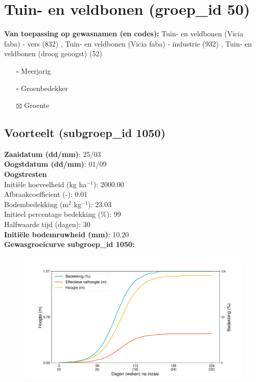 \documentclass{article}
\begin{document}
 \section{Tuin- en veldbonen (groep\_id 50)} 
 \textbf{Van toepassing op gewasnamen (en codes):} Tuin- en veldbonen (Vicia faba) - vers (832) , Tuin- en veldbonen (Vicia faba) - industrie (932) , Tuin- en veldbonen (droog geoogst) (52) 
 \begin{multicols}{3} \begin{itemize} \item[$\square$] Meerjarig \item[$\square$] Groenbedekker \item[$\boxtimes$] Groente \end{itemize} \end{multicols} 
 \subsection{Voorteelt (subgroep\_id 1050)} 
  \textbf{Zaaidatum (dd/mm)}: 25/03  \vspace{0.10cm} \\ 
  \textbf{Oogstdatum (dd/mm)}: 01/09  \vspace{0.10cm} \\ 
  \textbf{Oogstresten} \vspace{0.05cm} \\ 
  \tab Initi\"{e}le hoeveelheid (kg ha$^{-1}$): 2000.00 \vspace{0.05cm} \\ 
  \tab Afbraakcoefficient (-): 0.01 \vspace{0.05cm} \\ 
  \tab Bodembedekking (m$^2$ kg$^{-1}$): 23.03 \vspace{0.05cm} \\ 
  \tab Initieel percentage bedekking (\%): 99 \vspace{0.05cm} \\ 
  \tab Halfwaarde tijd (dagen): 30 \vspace{0.05cm} \\ 
  \textbf{Initi\"{e}le bodemruwheid (mm)}: 10.20 \vspace{0.05cm} \\ 
  \textbf{Gewasgroeicurve subgroep\_id 1050:} 
 \begin{center} \begin{figure}[H] \includegraphics[width=12.5cm]{temp/1050.png} \end{figure} \end{center} 
\end{document}
